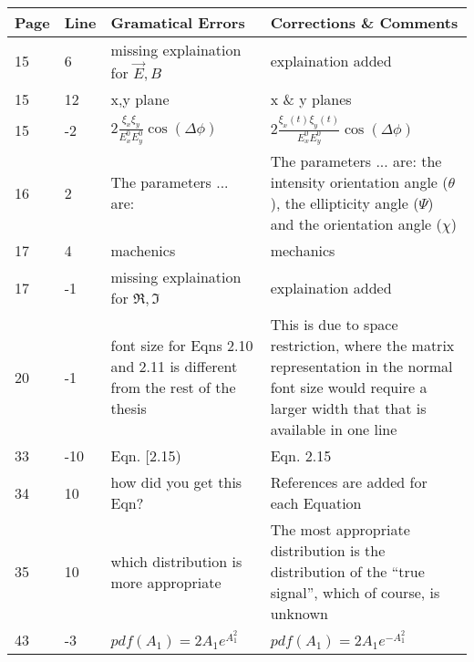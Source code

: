 \noindent
\begin{longtable}[c]{p{}|p{}|p{}|p{}}
\textbf{Page} & \textbf{Line} & \textbf{Gramatical Errors} & \textbf{Corrections \& Comments} \\
 \hline
 \endhead
15 & 6 & missing explaination for $\vec{E},B$ & explaination added \\
15 & 12 & x,y plane & x \& y planes \\
15 & -2 & $2 \frac{\xi_x \xi_y}{E_x^0 E_y^0} \cos (\Delta \phi)$ & $2 \frac{\xi_x(t) \xi_y(t)}{E_x^0 E_y^0} \cos (\Delta \phi)$ \\
16 & 2 & The parameters ... are: & The parameters ... are: the intensity orientation angle ($\theta$), the ellipticity angle ($\Psi$) and the orientation angle ($\chi$) \\
17 & 4 & machenics & mechanics \\
17 & -1 & missing explaination for $\Re,\Im$ & explaination added \\
20 & -1 & font size for Eqns 2.10 and 2.11 is different from the rest of the thesis & This is due to space restriction, where the matrix representation in the normal font size would require a larger width that that is available in one line \\
33 & -10 & Eqn. [2.15) & Eqn. 2.15 \\
34 & 10 & how did you get this Eqn? & References are added for each Equation \\
35 & 10 & which distribution is more appropriate & The most appropriate distribution is the distribution of the ``true signal'', which of course, is unknown \\
43 & -3 & $pdf(A_1)=2A_1e^{A_1^2}$ & $pdf(A_1)=2A_1e^{-A_1^2}$ \\
\end{longtable}    

